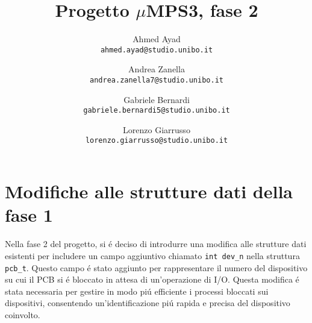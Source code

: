 \documentclass[a4paper]{article}
\title{Progetto $\mu$MPS3, fase 2}
\author{
 Ahmed Ayad\\
  \texttt{ahmed.ayad@studio.unibo.it}
  \and
  Andrea Zanella\\
  \texttt{andrea.zanella7@studio.unibo.it}
  \and
  Gabriele Bernardi\\
  \texttt{gabriele.bernardi5@studio.unibo.it}
  \and
  Lorenzo Giarrusso\\
  \texttt{lorenzo.giarrusso@studio.unibo.it}
}
\begin{document}
\maketitle
\pagebreak
\tableofcontents
\pagebreak
\section{Modifiche alle strutture dati della fase 1}
Nella fase 2 del progetto, si \'e deciso di introdurre una modifica alle strutture dati esistenti per includere un campo aggiuntivo chiamato \verb+int dev_n+ nella struttura \verb+pcb_t+. Questo campo \'e stato aggiunto per rappresentare il numero del dispositivo su cui il PCB si \'e bloccato in attesa di un'operazione di I/O. Questa modifica \'e stata necessaria per gestire in modo pi\'u efficiente i processi bloccati sui dispositivi, consentendo un'identificazione pi\'u rapida e precisa del dispositivo coinvolto.
\end{document}
